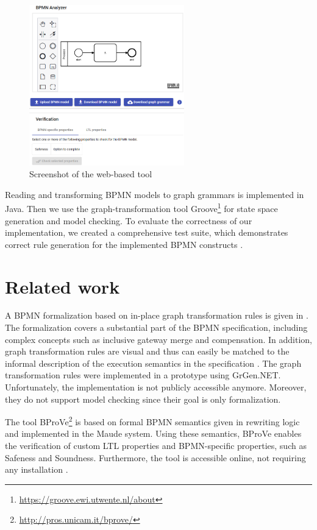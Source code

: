 \documentclass[submission, copyright, creativecommons]{eptcs}
\begin{document}
\begin{figure}[h]
    \centering
    \includegraphics[width=0.6\textwidth]{images/impl.png}
    \caption{Screenshot of the web-based tool}
    \label{fig:implScreenshot}
\end{figure}

Reading and transforming BPMN models to graph grammars is implemented in Java.
Then we use the graph-transformation tool Groove\footnote{\url{https://groove.ewi.utwente.nl/about}} for state space generation and model checking.
To evaluate the correctness of our implementation, we created a comprehensive test suite, which demonstrates correct rule generation for the implemented BPMN constructs \cite{timkrauterArtifactsTERMGRAPH2022}.

\section{Related work} \label{sec:relatedWork}
A BPMN formalization based on in-place graph transformation rules is given in \cite{vangorpVisualTokenbasedFormalization2013}.
The formalization covers a substantial part of the BPMN specification, including complex concepts such as inclusive gateway merge and compensation.
In addition, graph transformation rules are visual and thus can easily be matched to the informal description of the execution semantics in the specification \cite{objectmanagementgroupBusinessProcessModel2013}.
The graph transformation rules were implemented in a prototype using GrGen.NET.
Unfortunately, the implementation is not publicly accessible anymore.
Moreover, they do not support model checking since their goal is only formalization.

The tool BProVe\footnote{\url{http://pros.unicam.it/bprove/}} is based on formal BPMN semantics given in rewriting logic and implemented in the Maude system.
Using these semantics, BProVe enables the verification of custom LTL properties and BPMN-specific properties, such as Safeness and Soundness.
Furthermore, the tool is accessible online, not requiring any installation \cite{corradiniFormalApproachAnalysis2021}.
\end{document}
